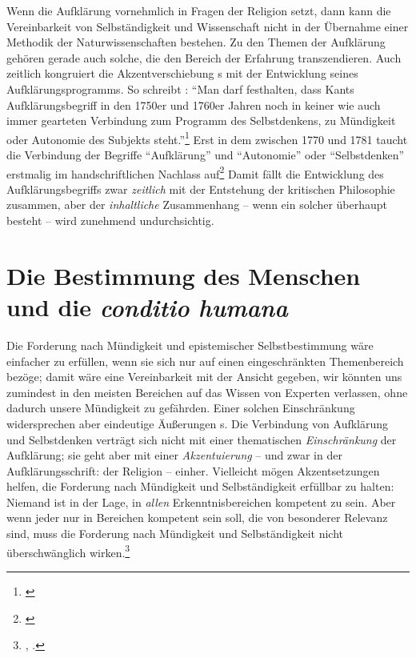 Wenn  die Aufklärung vornehmlich in Fragen der
Religion setzt, dann kann die Vereinbarkeit von Selbständigkeit und Wissenschaft
nicht in der Übernahme einer Methodik der Naturwissenschaften bestehen. Zu den
Themen der Aufklärung gehören gerade auch solche, die den Bereich der Erfahrung
transzendieren. Auch zeitlich kongruiert die Akzentverschiebung
s mit der Entwicklung seines Aufklärungsprogramms.
So schreibt : \enquote{Man darf \punkt{}
festhalten, dass Kants Aufklärungsbegriff in den 1750er und 1760er Jahren noch
in keiner wie
auch immer gearteten Verbindung zum Programm des Selbstdenkens, zu Mündigkeit
oder Autonomie des Subjekts
steht.}\footnote{\cite[][134]{Kreimendahl:KantsvorkritischesProgrammderAufklaerung2009}}
Erst in dem  zwischen 1770 und 1781 taucht die
Verbindung der Begriffe \enquote{Aufklärung} und \enquote{Autonomie} oder
\enquote{Selbstdenken} erstmalig im handschriftlichen Nachlass
auf\footnote{\cite[Vgl.][\pno~134\,f.]{Kreimendahl:KantsvorkritischesProgrammderAufklaerung2009}}
Damit fällt die Entwicklung des Aufklärungsbegriffs zwar \emph{zeitlich}
mit der Entstehung der kritischen Philosophie zusammen, aber der
\emph{inhaltliche} Zusammenhang -- wenn ein solcher überhaupt besteht -- wird
zunehmend undurchsichtig.


\section{Die Bestimmung des Menschen und die \emph{conditio
humana}}\label{subsection:DieBestimmungdesMenschen} Die Forderung nach
Mündigkeit und epistemischer Selbstbestimmung wäre einfacher zu erfüllen, wenn
sie sich nur auf einen eingeschränkten Themenbereich bezöge; damit wäre eine
Vereinbarkeit mit der Ansicht gegeben, wir könnten uns zumindest in den meisten
Bereichen auf das Wissen von Experten verlassen, ohne dadurch unsere Mündigkeit
zu gefährden. Einer solchen Einschränkung widersprechen aber eindeutige
Äußerungen s. Die Verbindung von Aufklärung und
Selbstdenken verträgt sich nicht mit einer thematischen
\emph{Einschränkung} der Aufklärung; sie geht aber mit einer
\emph{Akzentuierung} -- und zwar in der Aufklärungsschrift: der Religion --
einher. Vielleicht mögen Akzentsetzungen helfen, die Forderung nach Mündigkeit
und Selbständigkeit erfüllbar zu halten: Niemand ist in der Lage, in
\emph{allen} Erkenntnisbereichen kompetent zu sein. Aber wenn jeder nur in
Bereichen kompetent sein soll, die von besonderer Relevanz sind, muss die
Forderung nach Mündigkeit und Selbständigkeit nicht überschwänglich
wirken.\footnote{\cite[Vgl.][\S~40]{Kant:KritikderUrteilskraft2009}, \cite[V:
294.29--37]{Kant:GesammelteWerke1900ff.}.}


